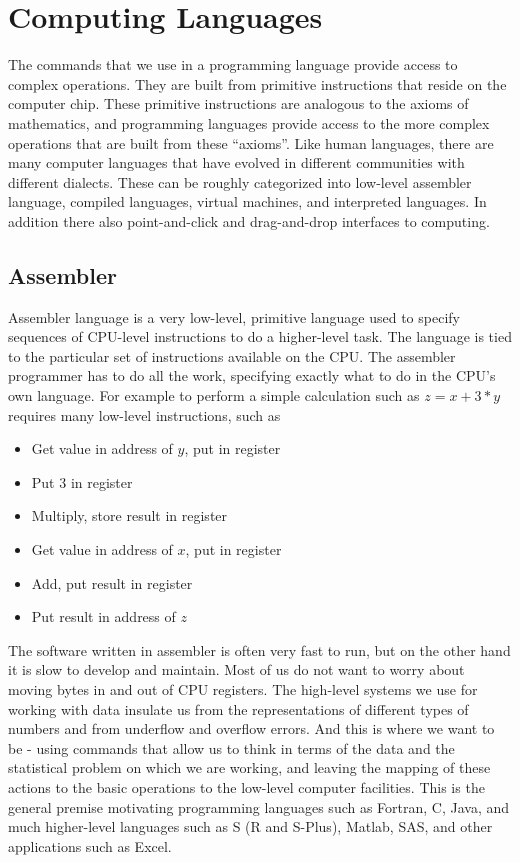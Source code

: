 \section{Computing Languages}
The commands that we use in a programming language provide access to
complex operations.  They are built from primitive instructions that
reside on the computer chip.  These primitive instructions are
analogous to the axioms of mathematics, and programming languages
provide access to the more complex operations that are built from
these ``axioms''.  Like human languages, there are many computer
languages that have evolved in different communities with different
dialects.  These can be roughly categorized into low-level assembler
language, compiled languages, virtual machines, and interpreted
languages.  In addition there also point-and-click and drag-and-drop
interfaces to computing.


\subsection{Assembler} 
Assembler language is a very low-level, primitive language used to
specify sequences of CPU-level instructions to do a higher-level task.
The language is tied to the particular set of instructions available
on the CPU.  The assembler programmer has to do all the work,
specifying exactly what to do in the CPU's own language. For example
to perform a simple calculation such as $z = x + 3*y$ requires many
low-level instructions, such as
\begin{itemize}
\item Get value in address of $y$, put in register
\item Put 3 in register
\item Multiply, store result in register
\item Get value in address of $x$, put in register
\item Add, put result in register
\item Put result in address of $z$
\end{itemize}

The software written in assembler is often very fast to run, but on
the other hand it is slow to develop and maintain.  Most of us do not
want to worry about moving bytes in and out of CPU registers. The
high-level systems we use for working with data insulate us from the
representations of different types of numbers and from underflow and
overflow errors.  And this is where we want to be - using commands
that allow us to think in terms of the data and the statistical
problem on which we are working, and leaving the mapping of these
actions to the basic operations to the low-level computer
facilities. This is the general premise motivating programming
languages such as Fortran, C, Java, and much higher-level languages
such as S (R and S-Plus), Matlab, SAS, and other applications such as
Excel.

